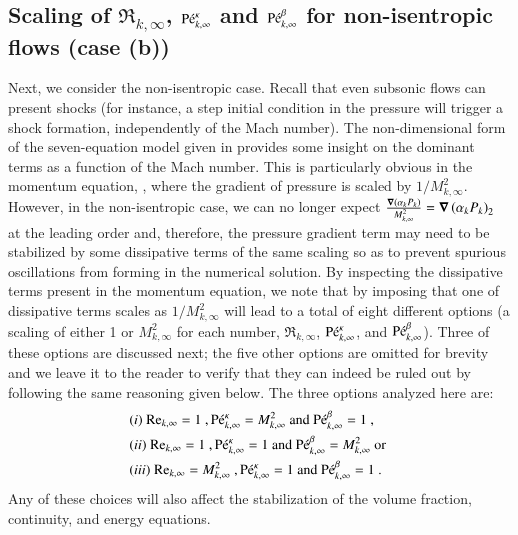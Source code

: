 \documentclass[preprint,10pt]{elsarticle}
\begin{document}
\subsection{Scaling of $\Re_{k,\infty}$, $\textrm{P\'e}_{k,\infty}^\kappa$ and $\textrm{P\'e}_{k,\infty}^\beta$ for non-isentropic flows (case (b))}\label{eq:non_isent_flows}
Next, we consider the non-isentropic case. Recall that even subsonic flows can present shocks (for instance, 
a step initial condition in the pressure will trigger a shock formation, independently of the Mach number). 
The non-dimensional form of the seven-equation model given in  provides some insight on the 
dominant terms as a function of the Mach number. This is particularly obvious in the momentum equation, , 
where the gradient of pressure is scaled by $1/M_{k,\infty}^2$. However, in the non-isentropic case, we can no longer 
expect $\frac{\boldsymbol\nabla \left( \alpha_k P_k \right)}{M_{k,\infty}^2}=\boldsymbol\nabla \left( \alpha_k P_k \right)_2$ at the leading order and, therefore, the pressure gradient term may need to be stabilized by 
some dissipative terms of the same scaling so as to prevent spurious oscillations from forming in the numerical solution. 
By inspecting the dissipative terms present in the momentum equation, we note that by imposing that one of dissipative terms 
scales as $1/M_{k,\infty}^2$ will lead to a total of eight different options (a scaling of either 1 or $M^2_{k,\infty}$ for each number, 
$\Re_{k,\infty}$, $\textrm{P\'e}_{k,\infty}^\kappa$, and $\textrm{P\'e}_{k,\infty}^\beta$). Three of these options are discussed next; the five other 
options are omitted for brevity and we leave it to the reader to verify that they can indeed be ruled out by following the same reasoning given below. The three options analyzed here are:
%
\begin{align}
&(i) \ \textrm{Re}_{k,\infty} = 1 \ , \textrm{P\'e}_{k,\infty}^\kappa = M_{k,\infty}^2 \text{ and } \textrm{P\'e}_{k,\infty}^\beta = 1 \ , \nonumber \\
&(ii) \ \textrm{Re}_{k,\infty} = 1 \ , \textrm{P\'e}_{k,\infty}^\kappa = 1 \text{ and } \textrm{P\'e}_{k,\infty}^\beta = M_{k,\infty}^2 \text{ or } \nonumber \\
&(iii) \ \textrm{Re}_{k,\infty} = M_{k,\infty}^2 \ , \textrm{P\'e}_{k,\infty}^\kappa = 1 \text{ and } \textrm{P\'e}_{k,\infty}^\beta = 1 \ . \nonumber
\end{align}
%
Any of these choices will also affect the stabilization of the volume fraction, continuity, and energy equations. 
\end{document}
